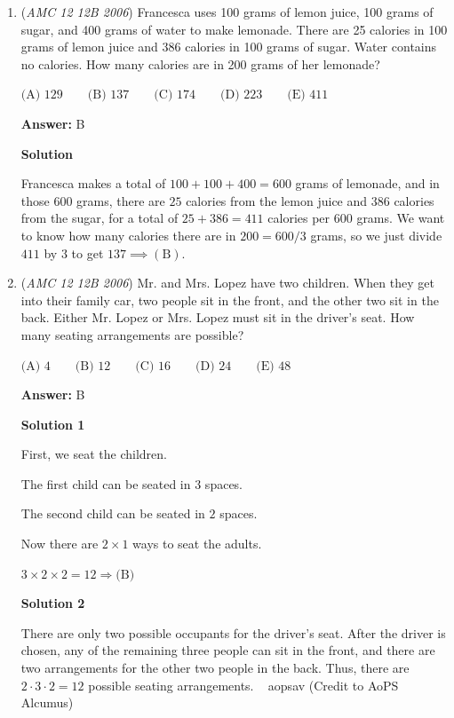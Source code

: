 \begin{enumerate}
 


	\item (\textit{AMC 12 12B 2006}) Francesca uses 100 grams of lemon juice, 100 grams of sugar, and 400 grams of water to make lemonade.  There are 25 calories in 100 grams of lemon juice and 386 calories in 100 grams of sugar.  Water contains no calories.  How many calories are in 200 grams of her lemonade?


 $\text {(A) } 129 \qquad \text {(B) } 137 \qquad \text {(C) } 174 \qquad \text {(D) } 223 \qquad \text {(E) } 411$

 \textbf{Answer: }B



\textbf{Solution}

Francesca makes a total of $100+100+400=600$ grams of lemonade, and in those $600$ grams, there are $25$ calories from the lemon juice and $386$ calories from the sugar, for a total of $25+386=411$ calories per $600$ grams. We want to know how many calories there are in $200=600/3$ grams, so we just divide $411$ by $3$ to get $137\implies\boxed{(\text{B})}$.

 


	\item (\textit{AMC 12 12B 2006}) Mr. and Mrs. Lopez have two children.  When they get into their family car, two people sit in the front, and the other two sit in the back.  Either Mr. Lopez or Mrs. Lopez must sit in the driver's seat.  How many seating arrangements are possible?


 $\text {(A) } 4 \qquad \text {(B) } 12 \qquad \text {(C) } 16 \qquad \text {(D) } 24 \qquad \text {(E) } 48$

 \textbf{Answer: }B



\textbf{Solution 1}

First, we seat the children.

 The first child can be seated in $3$ spaces.

 The second child can be seated in $2$ spaces.

 Now there are $2 \times 1$ ways to seat the adults.

 $3 \times 2 \times 2 = 12 \Rightarrow \text{(B)}$




\textbf{Solution 2}

There are only two possible occupants for the driver's seat. After the driver is chosen, any of the remaining three people can sit in the front, and there are two arrangements for the other two people in the back. Thus, there are $2\cdot 3\cdot 2 = \boxed{12}$ possible seating arrangements. ~ aopsav (Credit to AoPS Alcumus)


\end{enumerate}
